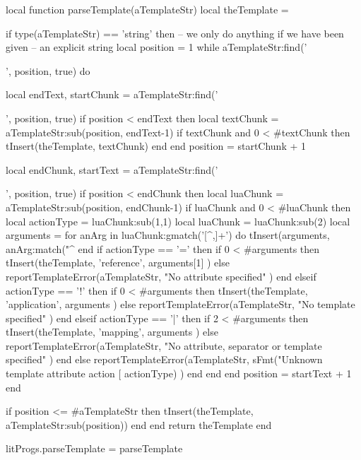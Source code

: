 local function parseTemplate(aTemplateStr)
  local theTemplate = { }

  if type(aTemplateStr) == 'string' then
    -- we only do anything if we have been given
    -- an explicit string
    local position = 1
    while aTemplateStr:find('{{', position, true) do

      local endText, startChunk = aTemplateStr:find('{{', position, true)
      if position < endText then
        local textChunk = aTemplateStr:sub(position, endText-1)
        if textChunk and 0 < #textChunk then
          tInsert(theTemplate, textChunk)
        end
      end
      position = startChunk + 1

      local endChunk, startText = aTemplateStr:find('}}', position, true)
      if position < endChunk then
        local luaChunk = aTemplateStr:sub(position, endChunk-1)
        if luaChunk and 0 < #luaChunk then
          local actionType = luaChunk:sub(1,1)
          local luaChunk = luaChunk:sub(2)
          local arguments = { }
          for anArg in luaChunk:gmatch('[^,]+') do
            tInsert(arguments, anArg:match("^%
          end
          if actionType == '=' then
            if 0 < #arguments then
              tInsert(theTemplate, { 'reference', arguments[1] })
            else
              reportTemplateError(aTemplateStr,
                "No attribute specified"
              )
            end
          elseif actionType == '!' then
            if 0 < #arguments then
              tInsert(theTemplate, { 'application', arguments })
            else
              reportTemplateError(aTemplateStr,
                "No template specified"
              )
            end
          elseif actionType == '|' then
            if 2 < #arguments then
              tInsert(theTemplate, { 'mapping', arguments })
            else
              reportTemplateError(aTemplateStr,
                "No attribute, separator or template specified"
              )
            end
          else
            reportTemplateError(aTemplateStr,
              sFmt("Unknown template attribute action [%
                actionType)
            )
          end
        end
      end
      position = startText + 1
    end

    if position <= #aTemplateStr then
      tInsert(theTemplate, aTemplateStr:sub(position))
    end
  end
  return theTemplate
end

litProgs.parseTemplate = parseTemplate
\stopLuaCode


}}
